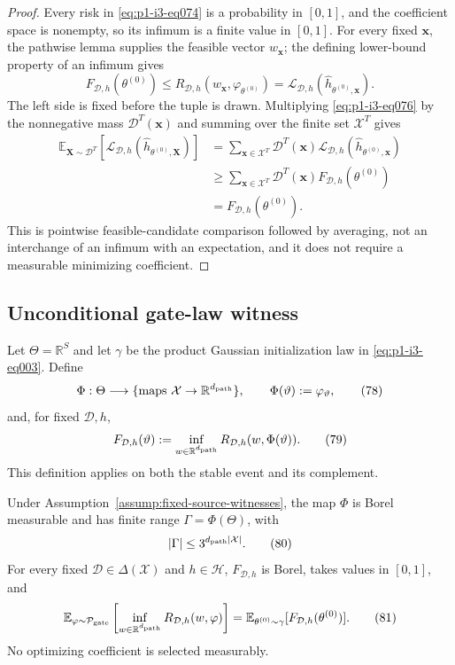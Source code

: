 \begin{proof}
Every risk in \eqref{eq:p1-i3-eq074} is a probability in $[0,1]$, and the coefficient space is
nonempty, so its infimum is a finite value in $[0,1]$.  For every fixed
$\mathbf x$, the pathwise lemma supplies the feasible vector $w_{\mathbf x}$;
the defining lower-bound property of an infimum gives
\[
F_{\mathcal D,h}(\theta^{(0)})
\leq R_{\mathcal D,h}(w_{\mathbf x},\varphi_{\theta^{(0)}})
=\mathcal L_{\mathcal D,h}
(\widehat h_{\theta^{(0)},\mathbf x}).
\tag{76}\label{eq:p1-i3-eq076}
\]
The left side is fixed before the tuple is drawn.  Multiplying \eqref{eq:p1-i3-eq076} by the
nonnegative mass $\mathcal D^T(\mathbf x)$ and summing over the finite set
$\mathcal X^T$ gives
\[
\begin{aligned}
\mathbb E_{\mathbf X\sim\mathcal D^T}
\left[\mathcal L_{\mathcal D,h}
(\widehat h_{\theta^{(0)},\mathbf X})\right]
&=\sum_{\mathbf x\in\mathcal X^T}\mathcal D^T(\mathbf x)
\mathcal L_{\mathcal D,h}(\widehat h_{\theta^{(0)},\mathbf x})\\
&\geq\sum_{\mathbf x\in\mathcal X^T}\mathcal D^T(\mathbf x)
F_{\mathcal D,h}(\theta^{(0)})\\
&=F_{\mathcal D,h}(\theta^{(0)}).
\end{aligned}
\tag{77}\label{eq:p1-i3-eq077}
\]
This is pointwise feasible-candidate comparison followed by averaging, not an
interchange of an infimum with an expectation, and it does not require a
measurable minimizing coefficient.
\end{proof}


\subsection{Unconditional gate-law witness}
\label{app:step006-witness}

Let $\Theta=\mathbb R^S$ and let $\gamma$ be the product Gaussian
initialization law in \eqref{eq:p1-i3-eq003}.  Define
\[
\Phi:\Theta\longrightarrow\{\text{maps }\mathcal X\to\mathbb R^{d_{\rm path}}\},
\qquad \Phi(\vartheta):=\varphi_\vartheta,
\tag{78}\label{eq:p1-i3-eq078}
\]
and, for fixed $\mathcal D,h$,
\[
F_{\mathcal D,h}(\vartheta):=
\inf_{w\in\mathbb R^{d_{\rm path}}}
R_{\mathcal D,h}(w,\Phi(\vartheta)).
\tag{79}\label{eq:p1-i3-eq079}
\]
This definition applies on both the stable event and its complement.

\begin{lemma}
\label{lem:p1-i3-step006-gate-pushforward}
Under Assumption~\ref{assump:fixed-source-witnesses}, the map $\Phi$ is Borel
measurable and has finite range $\Gamma=\Phi(\Theta)$, with
\[
|\Gamma|\leq3^{d_{\rm path}|\mathcal X|}.
\tag{80}\label{eq:p1-i3-eq080}
\]
For every fixed $\mathcal D\in\Delta(\mathcal X)$ and $h\in\mathcal H$,
$F_{\mathcal D,h}$ is Borel, takes values in $[0,1]$, and
\[
\mathbb E_{\varphi\sim\mathcal P_{\rm gate}}
\left[\inf_{w\in\mathbb R^{d_{\rm path}}}
R_{\mathcal D,h}(w,\varphi)\right]
=\mathbb E_{\theta^{(0)}\sim\gamma}
[F_{\mathcal D,h}(\theta^{(0)})].
\tag{81}\label{eq:p1-i3-eq081}
\]
No optimizing coefficient is selected measurably.
\end{lemma}

